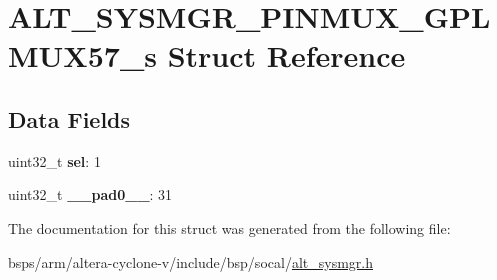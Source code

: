 \hypertarget{structALT__SYSMGR__PINMUX__GPLMUX57__s}{}\section{A\+L\+T\+\_\+\+S\+Y\+S\+M\+G\+R\+\_\+\+P\+I\+N\+M\+U\+X\+\_\+\+G\+P\+L\+M\+U\+X57\+\_\+s Struct Reference}
\label{structALT__SYSMGR__PINMUX__GPLMUX57__s}
\subsection*{Data Fields}
\begin{DoxyCompactItemize}
\item 
\mbox{\label{structALT__SYSMGR__PINMUX__GPLMUX57__s_a516e6602562cd5e25cee68043747b7de}} 
uint32\+\_\+t {\bfseries sel}\+: 1
\item 
\mbox{\label{structALT__SYSMGR__PINMUX__GPLMUX57__s_a142bf16bce31558a7764874fe7320e4b}} 
uint32\+\_\+t {\bfseries \+\_\+\+\_\+pad0\+\_\+\+\_\+}\+: 31
\end{DoxyCompactItemize}


The documentation for this struct was generated from the following file\+:\begin{DoxyCompactItemize}
\item 
bsps/arm/altera-\/cyclone-\/v/include/bsp/socal/\mbox{\hyperlink{alt__sysmgr_8h}{alt\+\_\+sysmgr.\+h}}\end{DoxyCompactItemize}
